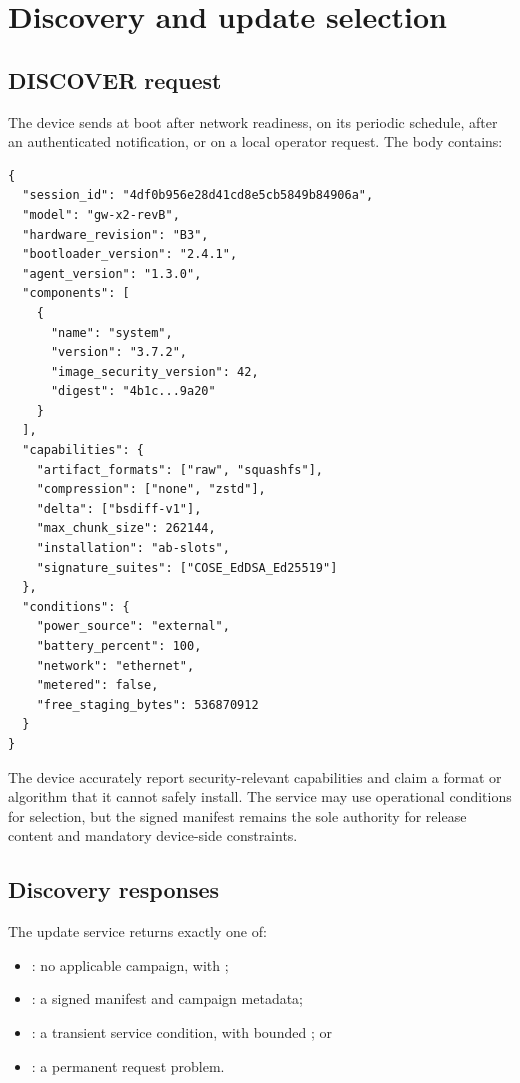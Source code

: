 \section{Discovery and update selection}

\subsection{DISCOVER request}

The device sends  at boot after network readiness, on its periodic
schedule, after an authenticated notification, or on a local operator request.
The body contains:

\begin{lstlisting}[language={}]
{
  "session_id": "4df0b956e28d41cd8e5cb5849b84906a",
  "model": "gw-x2-revB",
  "hardware_revision": "B3",
  "bootloader_version": "2.4.1",
  "agent_version": "1.3.0",
  "components": [
    {
      "name": "system",
      "version": "3.7.2",
      "image_security_version": 42,
      "digest": "4b1c...9a20"
    }
  ],
  "capabilities": {
    "artifact_formats": ["raw", "squashfs"],
    "compression": ["none", "zstd"],
    "delta": ["bsdiff-v1"],
    "max_chunk_size": 262144,
    "installation": "ab-slots",
    "signature_suites": ["COSE_EdDSA_Ed25519"]
  },
  "conditions": {
    "power_source": "external",
    "battery_percent": 100,
    "network": "ethernet",
    "metered": false,
    "free_staging_bytes": 536870912
  }
}
\end{lstlisting}

The device \must accurately report security-relevant capabilities and \mustnot
claim a format or algorithm that it cannot safely install. The service may use
operational conditions for selection, but the signed manifest remains the sole
authority for release content and mandatory device-side constraints.

\subsection{Discovery responses}

The update service returns exactly one of:

\begin{itemize}
  \item {}: no applicable campaign, with ;
  \item {}: a signed manifest and campaign metadata;
  \item {}: a transient service condition, with bounded ; or
  \item {}: a permanent request problem.
\end{itemize}


